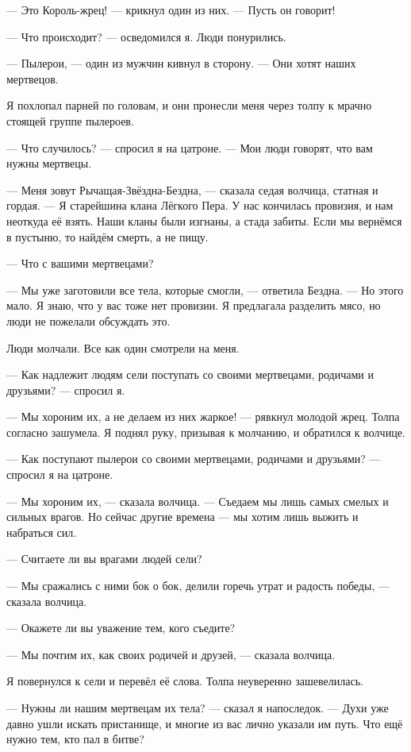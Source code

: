 --- Это Король-жрец! --- крикнул один из них.
--- Пусть он говорит!

--- Что происходит? --- осведомился я.
Люди понурились.

--- Пылерои, --- один из мужчин кивнул в сторону.
--- Они хотят наших мертвецов.

Я похлопал парней по головам, и они пронесли меня через толпу к мрачно стоящей группе пылероев.

--- Что случилось? --- спросил я на цатроне.
--- Мои люди говорят, что вам нужны мертвецы.

--- Меня зовут Рычащая-Звёздна-Бездна, --- сказала седая волчица, статная и гордая.
--- Я старейшина клана Лёгкого Пера.
У нас кончилась провизия, и нам неоткуда её взять.
Наши кланы были изгнаны, а стада забиты.
Если мы вернёмся в пустыню, то найдём смерть, а не пищу.

--- Что с вашими мертвецами?

--- Мы уже заготовили все тела, которые смогли, --- ответила Бездна.
--- Но этого мало.
Я знаю, что у вас тоже нет провизии.
Я предлагала разделить мясо, но люди не пожелали обсуждать это.

Люди молчали.
Все как один смотрели на меня.

--- Как надлежит людям сели поступать со своими мертвецами, родичами и друзьями? --- спросил я.

--- Мы хороним их, а не делаем из них жаркое! --- рявкнул молодой жрец.
Толпа согласно зашумела.
Я поднял руку, призывая к молчанию, и обратился к волчице.

--- Как поступают пылерои со своими мертвецами, родичами и друзьями? --- спросил я на цатроне.

--- Мы хороним их, --- сказала волчица.
--- Съедаем мы лишь самых смелых и сильных врагов.
Но сейчас другие времена --- мы хотим лишь выжить и набраться сил.

--- Считаете ли вы врагами людей сели?

--- Мы сражались с ними бок о бок, делили горечь утрат и радость победы, --- сказала волчица.

--- Окажете ли вы уважение тем, кого съедите?

--- Мы почтим их, как своих родичей и друзей, --- сказала волчица.

Я повернулся к сели и перевёл её слова.
Толпа неуверенно зашевелилась.

--- Нужны ли нашим мертвецам их тела? --- сказал я напоследок.
--- Духи уже давно ушли искать пристанище, и многие из вас лично указали им путь.
Что ещё нужно тем, кто пал в битве?


